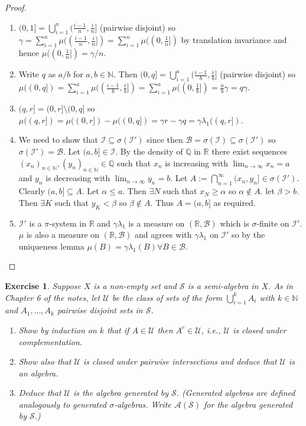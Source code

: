 \documentclass{article}
\newtheorem{exercise}[theorem]{Exercise}
\begin{document}
\begin{proof}
\begin{enumerate}
    \item[(a)] $(0,1]=\bigcup_{i=1}^n(\frac{i-1}{n},\frac{i}{n}]$ (pairwise disjoint) so $\gamma=\sum_{i=1}^n\mu((\frac{i-1}{n},\frac{i}{n}])=\sum_{i=1}^n\mu((0,\frac{1}{n}])$ by translation invariance and hence $\mu((0,\frac{1}{n}])=\gamma/n$.
    \item[(b)] Write $q$ as $a/b$ for $a,b\in\mathbb{N}$. Then $(0,q]=\bigcup_{i=1}^a(\frac{i-1}{b},\frac{i}{b}]$ (pairwise disjoint) so $\mu((0,q])=\sum_{i=1}^a\mu((\frac{i-1}{b},\frac{i}{b}])=\sum_{i=1}^a\mu((0,\frac{1}{b}])=\frac{a}{b}\gamma=q\gamma$.
    \item[(c)] $(q,r]=(0,r]\setminus(0,q]$ so $\mu((q,r])=\mu((0,r])-\mu((0,q])=\gamma r-\gamma q=\gamma\lambda_1((q,r])$.
\item[(d)] We need to show that $\mathcal{I}\subseteq\sigma(\mathcal{I}')$ since then $\mathcal{B}=\sigma(\mathcal{I})\subseteq\sigma(\mathcal{I}')$ so $\sigma(\mathcal{I}')=\mathcal{B}$. Let $(a,b]\in\mathcal{I}$. By the density of $\mathbb{Q}$ in $\mathbb{R}$ there exist sequences $(x_n)_{n\in\mathbb{N}},(y_n)_{n\in\mathbb{N}}\in\mathbb{Q}$ such that $x_n$ is increasing with $\lim_{n\to\infty}x_n=a$ and $y_n$ is decreasing with $\lim_{n\to\infty}y_n=b$. Let $A:=\bigcap_{n=1}^\infty(x_n,y_n]\in\sigma(\mathcal{I}')$. Clearly $(a,b]\subseteq A$. Let $\alpha\leq a$. Then $\exists N$ such that $x_N\geq\alpha$ so $\alpha\not\in A$. let $\beta>b$. Then $\exists K$ such that $y_K<\beta$ so $\beta\not\in A$. Thus $A=(a,b]$ as required.
\item[(e)] $\mathcal{I}'$ is a $\pi$-system in $\mathbb{R}$ and $\gamma\lambda_1$ is a measure on $(\mathbb{R},\mathcal{B})$ which is $\sigma$-finite on $\mathcal{I}'$. $\mu$ is also a measure on $(\mathbb{R},\mathcal{B})$ and agrees with $\gamma\lambda_1$ on $\mathcal{I}'$ so by the uniqueness lemma $\mu(B)=\gamma\lambda_1(B)\forall B\in\mathcal{B}$.
\end{enumerate}
\end{proof}
\begin{exercise}
    Suppose $X$ is a non-empty set and $\mathcal{S}$ is a semi-algebra in $X$. As in Chapter 6 of the notes, let $\mathcal{U}$ be the class of sets of the form $\bigcup_{i=1}^k A_i$ with $k \in \mathbb{N}$ and $A_1, \dots, A_k$ pairwise disjoint sets in $\mathcal{S}$.
    \begin{enumerate}
        \item[(a)] Show by induction on $k$ that if $A \in \mathcal{U}$ then $A^c \in \mathcal{U}$, i.e., $\mathcal{U}$ is closed under complementation.
        \item[(b)] Show also that $\mathcal{U}$ is closed under pairwise intersections and deduce that $\mathcal{U}$ is an algebra.
        \item[(c)] Deduce that $\mathcal{U}$ is the algebra generated by $\mathcal{S}$. (Generated algebras are defined analogously to generated $\sigma$-algebras. Write $\mathcal{A}(\mathcal{S})$ for the algebra generated by $\mathcal{S}$.)
    \end{enumerate}
\end{exercise}
\end{document}
